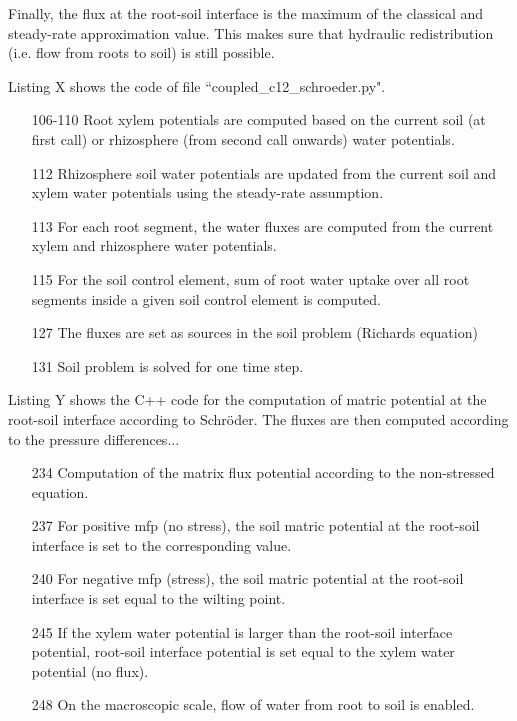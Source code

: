 Finally, the flux at the root-soil interface is the maximum of the classical and steady-rate approximation value. This makes sure that hydraulic redistribution (i.e. flow from roots to soil) is still possible. 

Listing X shows the code of file ``coupled_c12_schroeder.py".
%

\begin{itemize}
\item[106-110] Root xylem potentials are computed based on the current soil (at first call) or rhizosphere (from second call onwards) water potentials. 
\item[112] Rhizosphere soil water potentials are updated from the current soil and xylem water potentials using the steady-rate assumption. 
\item[113] For each root segment, the water fluxes are computed from the current xylem and rhizosphere water potentials. 
\item[115] For the soil control element, sum of root water uptake over all root segments inside a given soil control element is computed. 
\item[127] The fluxes are set as sources in the soil problem (Richards equation)
\item[131] Soil problem is solved for one time step. 
\end{itemize}

   
Listing Y shows the C++ code for the computation of matric potential at the root-soil interface according to Schröder. The fluxes are then computed according to the pressure differences...
%

\begin{itemize}
\item[234] Computation of the matrix flux potential according to the non-stressed equation. 
\item[237] For positive mfp (no stress), the soil matric potential at the root-soil interface is set to the corresponding value.
\item[240] For negative mfp (stress), the soil matric potential at the root-soil interface is set equal to the wilting point. 
\item[245] If the xylem water potential is larger than the root-soil interface potential, root-soil interface potential is set equal to the xylem water potential (no flux). 
\item[248] On the macroscopic scale, flow of water from root to soil is enabled. 
\end{itemize}


